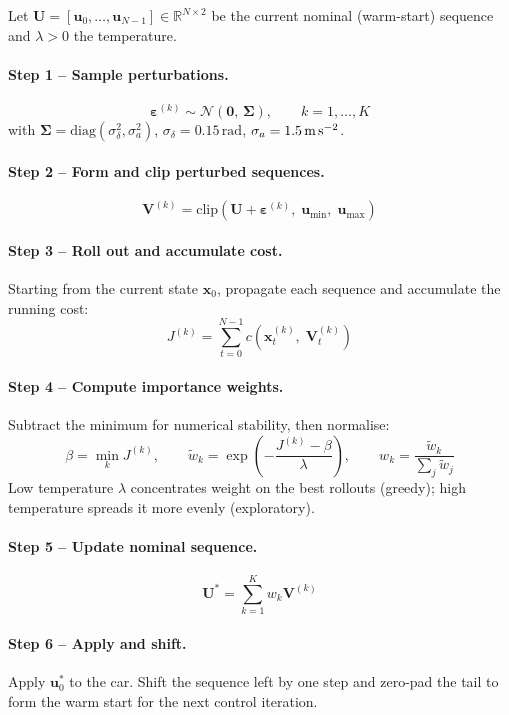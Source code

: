 \documentclass[11pt]{article}
\begin{document}
Let $\bm{U} = [\bm{u}_0, \dots, \bm{u}_{N-1}] \in \mathbb{R}^{N \times 2}$
be the current nominal (warm-start) sequence and $\lambda > 0$ the temperature.

\paragraph{Step 1 -- Sample perturbations.}
\[
\bm{\varepsilon}^{(k)} \sim \mathcal{N}(\bm{0},\, \bm{\Sigma}), \qquad k = 1,\dots,K
\]
with $\bm{\Sigma} = \mathrm{diag}(\sigma_\delta^2, \sigma_a^2)$,
$\sigma_\delta = 0.15\,\text{rad}$, $\sigma_a = 1.5\,\text{m\,s}^{-2}$.

\paragraph{Step 2 -- Form and clip perturbed sequences.}
\[
\bm{V}^{(k)} = \mathrm{clip}\!\left(\bm{U} + \bm{\varepsilon}^{(k)},\; \bm{u}_{\min},\; \bm{u}_{\max}\right)
\]

\paragraph{Step 3 -- Roll out and accumulate cost.}
Starting from the current state $\bm{x}_0$, propagate each sequence and
accumulate the running cost:
\[
J^{(k)} = \sum_{t=0}^{N-1} c\!\left(\bm{x}_t^{(k)},\; \bm{V}_t^{(k)}\right)
\]

\paragraph{Step 4 -- Compute importance weights.}
Subtract the minimum for numerical stability, then normalise:
\[
\beta = \min_k J^{(k)}, \qquad
\tilde{w}_k = \exp\!\left(-\frac{J^{(k)} - \beta}{\lambda}\right), \qquad
w_k = \frac{\tilde{w}_k}{\sum_j \tilde{w}_j}
\]
Low temperature $\lambda$ concentrates weight on the best rollouts (greedy);
high temperature spreads it more evenly (exploratory).

\paragraph{Step 5 -- Update nominal sequence.}
\[
\bm{U}^* = \sum_{k=1}^{K} w_k \bm{V}^{(k)}
\]

\paragraph{Step 6 -- Apply and shift.}
Apply $\bm{u}_0^*$ to the car.  Shift the sequence left by one step and zero-pad
the tail to form the warm start for the next control iteration.
\end{document}

